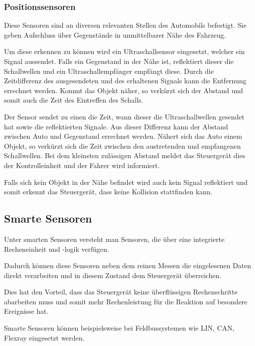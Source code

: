 \begin{flushleft}
	             
	             \subsubsection{Positionssensoren}
	
	                 Diese Sensoren sind an diversen relevanten Stellen des Automobils befestigt. Sie geben Aufschluss über Gegenstände in unmittelbarer Nähe des Fahrzeug.
	
	                 Um diese erkennen zu können wird ein Ultraschallsensor eingesetzt, welcher ein Signal aussendet. Falls ein Gegenstand in der Nähe ist, reflektiert dieser die Schallwellen und ein Ultraschallempfänger empfängt diese. 
	                 Durch die Zeitdifferenz des ausgesendeten und des erhaltenen Signals kann die Entfernung errechnet werden. Kommt das Objekt näher, so verkürzt sich der Abstand und somit auch die Zeit des Eintreffen des Schalls.
	
	                 Der Sensor sendet zu einen die Zeit, wann dieser die Ultraschallwellen gesendet hat sowie die reflektierten Signale. Aus dieser Differenz kann  der Abstand zwischen Auto und Gegenstand errechnet werden. 
	                 Nähert sich das Auto einem Objekt, so verkürzt sich die Zeit zwischen den austretenden und empfangenen Schallwellen. Bei dem kleinsten zulässigen Abstand meldet das Steuergerät dies der Kontrolleinheit und der Fahrer wird informiert.
	
	                 Falls sich kein Objekt in der Nähe befindet wird auch kein Signal reflektiert und somit erkennt das Steuergerät, dass keine Kollision stattfinden kann.
	
	                \subsection{Smarte Sensoren} 
	                 Unter smarten Sensoren versteht man Sensoren, die über eine integrierte Recheneinheit und -logik verfügen.
	                 
	                 Dadurch können diese Sensoren neben dem reinen Messen die eingelesenen Daten direkt verarbeiten und in diesem Zustand dem Steuergerät überreichen. 
	                 
	                 Dies hat den Vorteil, dass das Steuergerät keine überflüssigen Rechenschritte abarbeiten muss und somit mehr Rechenleistung für die Reaktion auf besondere Ereignisse hat.
	
	                 Smarte Sensoren können beispielsweise bei Feldbussystemen wie LIN, CAN, Flexray eingesetzt werden.		
	             	             

\end{flushleft}
